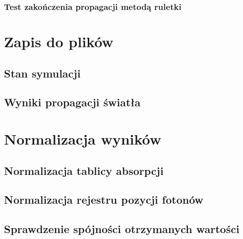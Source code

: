 \subsubsection{Test zakończenia propagacji metodą ruletki}

\section{Zapis do plików}
\subsection{Stan symulacji}
\subsection{Wyniki propagacji światła}
\section{Normalizacja wyników}
\subsection{Normalizacja tablicy absorpcji}
\subsection{Normalizacja rejestru pozycji fotonów}
\subsection{Sprawdzenie spójności otrzymanych wartości}
